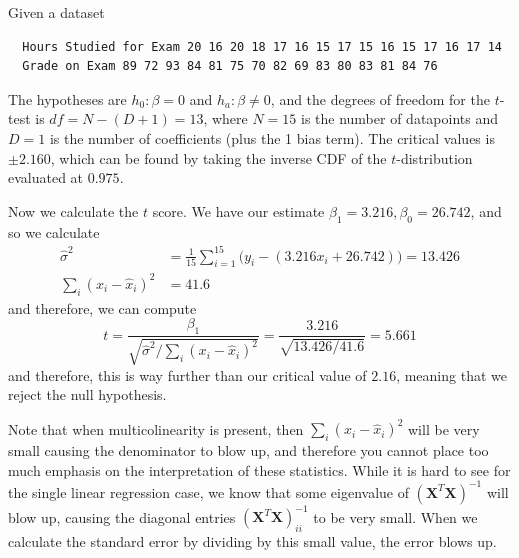   \begin{example}
    \label{ex:regression-of-exam-grade-on-hours-studied}
  Given a dataset 
  \begin{verbatim}
  Hours Studied for Exam 20 16 20 18 17 16 15 17 15 16 15 17 16 17 14
  Grade on Exam 89 72 93 84 81 75 70 82 69 83 80 83 81 84 76
  \end{verbatim}
  The hypotheses are $h_0 : \beta = 0$ and $h_a : \beta \neq 0$, and the degrees of freedom for the $t$-test is $df = N - (D + 1) = 13$, where $N = 15$ is the number of datapoints and $D = 1$ is the number of coefficients (plus the 1 bias term). The critical values is $\pm 2.160$, which can be found by taking the inverse CDF of the $t$-distribution evaluated at $0.975$. 

  Now we calculate the $t$ score. We have our estimate $\beta_1 = 3.216, \beta_0 = 26.742$, and so we calculate 
  \begin{align*}
      \hat{\sigma}^2 & = \frac{1}{15} \sum_{i=1}^{15} \big( y_i - (3.216 x_i + 26.742) \big) = 13.426 \\
      \sum_{i} (x_i - \hat{x}_i)^2 & = 41.6 
  \end{align*}
  and therefore, we can compute 
  \begin{equation}
    t = \frac{\beta_1}{\sqrt{\hat{\sigma}^2 /  \sum_{i} (x_i - \hat{x}_i)^2}} = \frac{3.216}{\sqrt{13.426/41.6}} = 5.661
  \end{equation}
  and therefore, this is way further than our critical value of $2.16$, meaning that we reject the null hypothesis. 
  \end{example}

  Note that when multicolinearity is present, then $\sum_{i} (x_i - \hat{x}_i)^2$ will be very small causing the denominator to blow up, and therefore you cannot place too much emphasis on the interpretation of these statistics. While it is hard to see for the single linear regression case, we know that some eigenvalue of $(\mathbf{X}^T \mathbf{X})^{-1}$ will blow up, causing the diagonal entries $(\mathbf{X}^T \mathbf{X})^{-1}_{ii}$ to be very small. When we calculate the standard error by dividing by this small value, the error blows up. 

